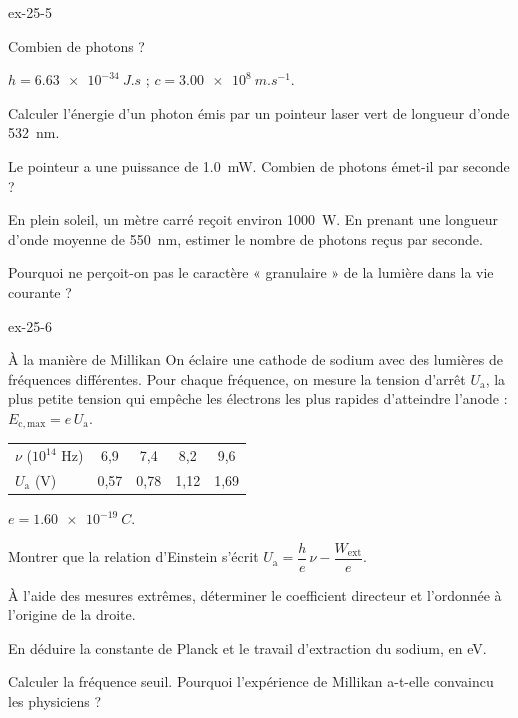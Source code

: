 \begin{blocLivre}{ex-25-5}
\begin{exercice}[1]{Combien de photons ?}
\begin{donnees}
$h=\qty{6,63e-34}{J.s}$ ; $c=\qty{3,00e8}{m.s^{-1}}$.
\end{donnees}
\begin{questions}
\item Calculer l'énergie d'un photon émis par un pointeur laser vert de longueur d'onde \qty{532}{nm}.
\item Le pointeur a une puissance de \qty{1,0}{mW}. Combien de photons émet-il par seconde ?
\item En plein soleil, un mètre carré reçoit environ \qty{1000}{W}. En prenant une longueur d'onde moyenne de
\qty{550}{nm}, estimer le nombre de photons reçus par seconde.
\item Pourquoi ne perçoit-on pas le caractère « granulaire » de la lumière dans la vie courante ?
\end{questions}
\end{exercice}
\end{blocLivre}
\begin{blocLivre}{ex-25-6}
\begin{exercice}[2]{À la manière de Millikan}
On éclaire une cathode de sodium avec des lumières de fréquences différentes. Pour chaque fréquence, on mesure la tension
d'arrêt $U_\mathrm{a}$, la plus petite tension qui empêche les électrons les plus rapides d'atteindre l'anode : $E_\mathrm{c,max}=e\,U_\mathrm{a}$.
\begin{center}
\begin{tabular}{lcccc}
\toprule
$\nu$ ($10^{14}$ Hz) & 6,9 & 7,4 & 8,2 & 9,6 \\
$U_\mathrm{a}$ (V) & 0,57 & 0,78 & 1,12 & 1,69 \\
\bottomrule
\end{tabular}
\end{center}
\begin{donnees}
$e=\qty{1,60e-19}{C}$.
\end{donnees}
\begin{questions}
\item Montrer que la relation d'Einstein s'écrit $U_\mathrm{a}=\dfrac{h}{e}\,\nu-\dfrac{W_\mathrm{ext}}{e}$.
\item À l'aide des mesures extrêmes, déterminer le coefficient directeur et l'ordonnée à l'origine de la droite.
\item En déduire la constante de Planck et le travail d'extraction du sodium, en eV.
\item Calculer la fréquence seuil. Pourquoi l'expérience de Millikan a-t-elle convaincu les physiciens ?
\end{questions}
\end{exercice}
\end{blocLivre}
